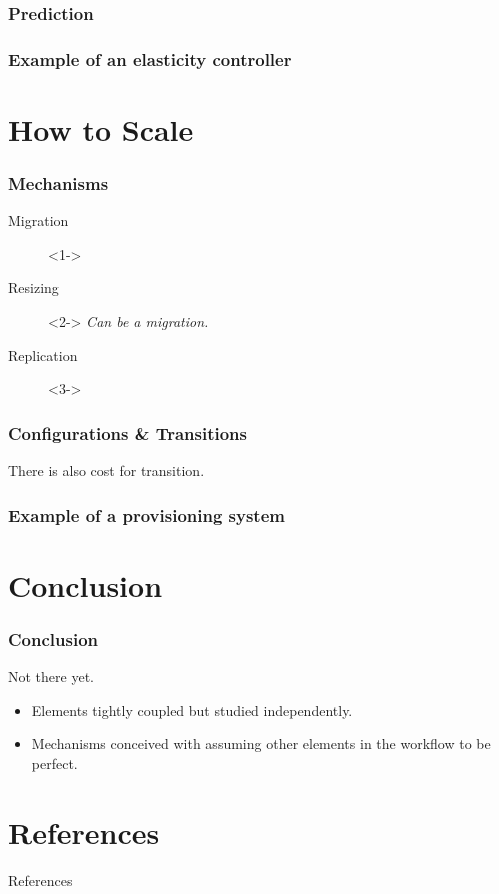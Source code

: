 \documentclass{beamer}
\begin{document}
\begin{frame}
  \frametitle{Prediction}
\end{frame}

\begin{frame}
  \frametitle{Example of an elasticity controller~\cite{moore2013coordinated}}
\end{frame}


\section{How to Scale}
\begin{frame}
  \frametitle{Mechanisms}
  \begin{description}
    \item[Migration]<1->
    \item[Resizing]<2-> \textit{Can be a migration.}
    \item[Replication]<3->
  \end{description}
\end{frame}

\begin{frame}
  \frametitle{Configurations \& Transitions}
  \vspace*{\fill}
  There is also cost for transition.
\end{frame}

\begin{frame}
  \frametitle{Example of a provisioning system~\cite{sharma2011cost}}
\end{frame}


\section*{Conclusion}
\begin{frame}
  \frametitle{Conclusion}
  Not there yet.
  \begin{itemize}
    \item Elements tightly coupled but studied independently.
    \item Mechanisms conceived with assuming other elements in the workflow to be perfect.
  \end{itemize}
\end{frame}


\appendix
\section*{References}
\begin{frame}[allowframebreaks]{References}
  
  
\end{frame}
\end{document}
